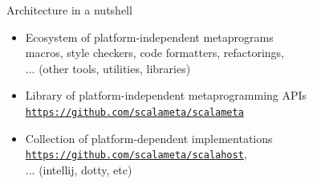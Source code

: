 \documentclass[svgnames,dvipsnames,hyperref={bookmarks=false},usepdftitle=false]{beamer}
\begin{document}
\begin{frame}[fragile]{Architecture in a nutshell}
\begin{itemize}
\item<3-> Ecosystem of platform-independent metaprograms\\
macros, style checkers, code formatters, refactorings,\\
... (other tools, utilities, libraries)
\vskip20pt
\item<1-> Library of platform-independent metaprogramming APIs\\
\texttt{\href{https://github.com/scalameta/scalameta}{https://github.com/scalameta/scalameta}}
\vskip20pt
\item<2-> Collection of platform-dependent implementations\\
\texttt{\href{https://github.com/scalameta/scalahost}{https://github.com/scalameta/scalahost}},\\
... (intellij, dotty, etc)
\end{itemize}
\end{frame}
\end{document}
